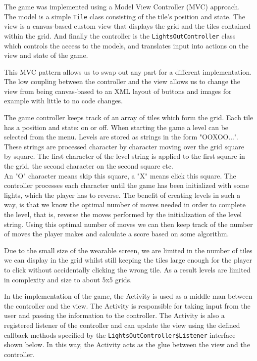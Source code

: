 The game was implemented using a Model View Controller (MVC) approach. The
model is a simple \texttt{Tile} class consisting of the tile's position and
state. The view is a canvas-based custom view that displays the grid and the
tiles contained within the grid. And finally the controller is the 
\texttt{LightsOutController} class which controls the access to the models,
and translates input into actions on the view and state of the game.

This MVC pattern allows us to swap out any part for a different implementation.
The low coupling between the controller and the view allows us to change the
view from being canvas-based to an XML layout of buttons and images for example
with little to no code changes.

The game controller keeps track of an array of tiles which form the grid. Each
tile has a position and state: on or off. When starting the game a level can
be selected from the menu. Levels are stored as strings in the form "OOXOO...".
These strings are processed character by character moving over the grid square
by square. The first character of the level string is applied to the first
square in the grid, the second character on the second square etc.\\
An "O" character means skip this square, a "X" means click this square. The
controller processes each character until the game has been initialized with
some lights, which the player has to reverse. The benefit of creating levels in
such a way, is that we know the optimal number of moves needed in order to
complete the level, that is, reverse the moves performed by the initialization
of the level string. Using this optimal number of moves we can then keep track
of the number of moves the player makes and calculate a score based on some
algorithm.

Due to the small size of the wearable screen, we are limited in the number of
tiles we can display in the grid whilst still keeping the tiles large enough
for the player to click without accidentally clicking the wrong tile. As a
result levels are limited in complexity and size to about 5x5 grids.

In the implementation of the game, the Activity is used as a middle man between
the controller and the view. The Activity is responsible for taking input from
the user and passing the information to the controller. The Activity is also
a registered listener of the controller and can update the view using the
defined callback methods specified by the \texttt{LightsOutController\$Listener}
interface shown below. In this way, the Activity acts as the glue between the
view and the controller.

